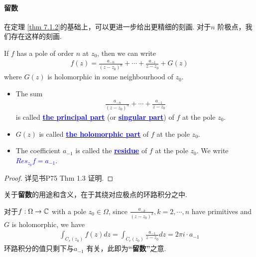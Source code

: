 \paragraph{留数}
	在定理 \ref{thm 7.1.2}的基础上，可以更进一步给出更精细的刻画. 对于$n$ 阶极点，我们存在这样的刻画.
	\begin{thm}\label{thm 7.1.3}
		If $f$ has a pole of order $n$ at $z_0$, then we can write
		\begin{align}
			f(z) = \frac{a_{-n}}{(z - z_0)^n} + \cdots + \frac{a_{-1}}{z - z_0} + G(z)
		\end{align}
		where $G(z)$ is holomorphic in some neighbourhood of $z_0$.
		
		\vspace{1em}
		\begin{rmk}
			\begin{itemize}
				\item The sum
				\begin{align}
					\frac{a_{-n}}{(z - z_0)^n} + \cdots + \frac{a_{-1}}{z - z_0}
				\end{align}
				is called \underline{\textcolor{blue}{\textbf{the principal part}}} (or \underline{\textcolor{blue}{\textbf{singular part}}}) of $f$ at the pole $z_0$.
				
				\vspace{1em}
				
				\item $G(z)$ is called \underline{\textcolor{blue}{\textbf{the holomorphic part}}} of $f$ at the pole $z_0$.
				
				\vspace{1em}
				
				\item The coefficient $a_{-1}$ is called the \underline{\textcolor{blue}{\textbf{residue}}} of $f$ at the pole $z_0$. We write \textcolor{blue}{$Res_{z_0}f = a_{-1}$}.
			\end{itemize}
		
			\vspace{1em}
			\begin{proof}
				详见书P75 Thm 1.3 证明.
			\end{proof}
		\end{rmk}
	\end{thm}

	\vspace{2em}
	关于\textbf{留数}的用途和含义，在于其绕对应极点的环路积分之中. 
	
	对于$f : \Omega \rightarrow \mathbb{C}$ with a pole $z_0 \in \Omega$, since $\frac{a_{-k}}{(z - z_0)^k} , k = 2, \cdots, n$ have primitives and $G$ is holomorphic, we have
	\begin{align}
		\int_{C_{r}(z_0)}{f(z) dz} = \int_{C_{r}(z_0)}{\frac{a_{-1}}{z - z_0} dz} = 2\pi i \cdot a_{-1}
	\end{align}
	环路积分的值只剩下与$a_{-1}$ 有关，此即为\textbf{“留数”}之意.
	
